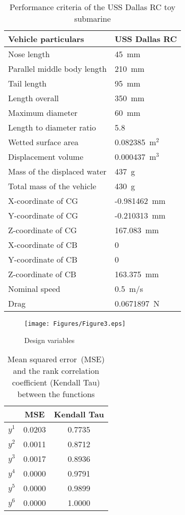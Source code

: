 \begin{table}[!htb]\scriptsize
	\caption{Performance criteria of the USS Dallas RC toy submarine}
	\label{table:performance_criteria_toysub}
	\centering
	\begin{tabular}{p{2.0in} l}
		\hline
		Vehicle particulars & USS Dallas RC\\
		\hline
		Nose length & 45~mm \\
		Parallel middle body length & 210~mm\\
		Tail length & 95~mm\\
		Length overall & 350~mm\\
		Maximum diameter & 60~mm\\
		Length to diameter ratio & 5.8\\
		Wetted surface area & 0.082385~m{$^2$}\\
		Displacement volume & 0.000437~m{$^3$}\\
		Mass of the displaced water & 437~g\\
		Total mass of the vehicle & 430~g\\
		X-coordinate of CG & -0.981462~mm\\
		Y-coordinate of CG & -0.210313~mm\\
		Z-coordinate of CG & 167.083~mm\\
		X-coordinate of CB & 0\\
		Y-coordinate of CB & 0\\
		Z-coordinate of CB & 163.375~mm\\
		Nominal speed & 0.5~m/s\\
		Drag & 0.0671897~N\\
		\hline
	\end{tabular}
\end{table}



\begin{figure}[!ht]
	\begin{center}
		\texttt{[image: Figures/Figure3.eps]}
		\caption{Design variables}
		\label{fig:toysub_param_illum}
	\end{center}       
\end{figure}





\begin{table}[!htb]
	\caption{Mean squared error~(MSE) and the rank correlation coefficient (Kendall Tau) between the functions}
	\label{table:mse_tau_toysub}
	\begin{center}
		\begin{tabular}{c|c|c}
			\hline
			&MSE&Kendall Tau\\
			\hline
			$y^1$ & 0.0203 & 0.7735\\
			$y^2$ & 0.0011 & 0.8712\\
			$y^3$ & 0.0017 & 0.8936\\
			$y^4$ & 0.0000 & 0.9791\\
			$y^5$ & 0.0000 & 0.9899\\
			$y^6$ & 0.0000 & 1.0000\\
			\hline
		\end{tabular}
	\end{center}
\end{table}


